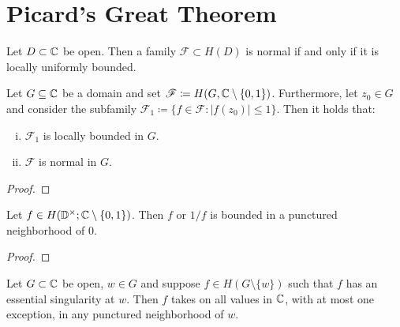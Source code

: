 \section{Picard's Great Theorem}
\label{sec:picards-great-theorem}

\begin{theorem}[Montel] \label{thm:montel}
    Let $D \subset \mathbb{C}$ be open. Then a family $\mathscr{F} \subset H(D)$ is normal if and only if it is locally uniformly bounded.
\end{theorem}

\begin{theorem}[Hurwitz] \label{thm:hurwitz}
\end{theorem}

\begin{lemma} \label{lem:montel-sharpened}
    Let $G \subseteq \mathbb{C}$ be a domain and set $\mathscr{F} \coloneqq H(G, \mathbb{C} \setminus \{ 0, 1 \})$. Furthermore, let $z_0 \in G$ and consider the subfamily $\mathscr{F}_1 \coloneqq \{ f \in \mathscr{F} : \vert f(z_0) \vert \leq 1 \}$. Then it holds that:
    \begin{enumerate}[i.]
        \item $\mathscr{F}_1$ is locally bounded in $G$.
        \item $\mathscr{F}$ is normal in $G$.
    \end{enumerate}
\end{lemma}

\begin{proof}
\end{proof}

\begin{lemma} \label{lem:great-picard-bounded}
    Let $f \in H(\mathbb{D}^\times; \mathbb{C} \setminus \{ 0, 1 \})$. Then $f$ or $1/f$ is bounded in a punctured neighborhood of $0$.
\end{lemma}

\begin{proof}
\end{proof}

\begin{theorem} \label{thm:picards-great-theorem}
    Let $G \subset \mathbb{C}$ be open, $w \in G$ and suppose $f \in H(G \setminus \{ w \})$ such that $f$ has an essential singularity at $w$. Then $f$ takes on all values in $\mathbb{C}$, with at most one exception, in any punctured neighborhood of $w$.
\end{theorem}

